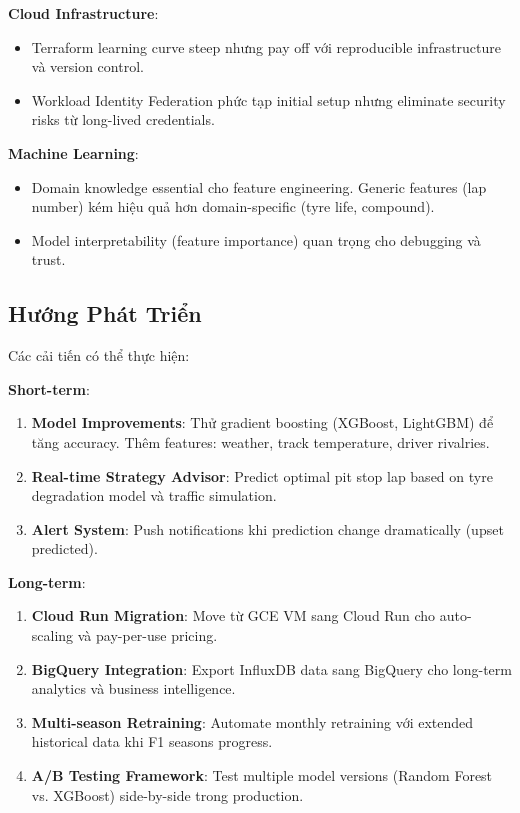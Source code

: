 \documentclass[conference,10pt]{IEEEtran}
\begin{document}
\textbf{Cloud Infrastructure}:
\begin{itemize}
    \item Terraform learning curve steep nhưng pay off với reproducible infrastructure và version control.
    \item Workload Identity Federation phức tạp initial setup nhưng eliminate security risks từ long-lived credentials.
\end{itemize}

\textbf{Machine Learning}:
\begin{itemize}
    \item Domain knowledge essential cho feature engineering. Generic features (lap number) kém hiệu quả hơn domain-specific (tyre life, compound).
    \item Model interpretability (feature importance) quan trọng cho debugging và trust.
\end{itemize}

\subsection{Hướng Phát Triển}

Các cải tiến có thể thực hiện:

\textbf{Short-term}:
\begin{enumerate}
    \item \textbf{Model Improvements}: Thử gradient boosting (XGBoost, LightGBM) để tăng accuracy. Thêm features: weather, track temperature, driver rivalries.

    \item \textbf{Real-time Strategy Advisor}: Predict optimal pit stop lap based on tyre degradation model và traffic simulation.

    \item \textbf{Alert System}: Push notifications khi prediction change dramatically (upset predicted).
\end{enumerate}

\textbf{Long-term}:
\begin{enumerate}
    \item \textbf{Cloud Run Migration}: Move từ GCE VM sang Cloud Run cho auto-scaling và pay-per-use pricing.

    \item \textbf{BigQuery Integration}: Export InfluxDB data sang BigQuery cho long-term analytics và business intelligence.

    \item \textbf{Multi-season Retraining}: Automate monthly retraining với extended historical data khi F1 seasons progress.

    \item \textbf{A/B Testing Framework}: Test multiple model versions (Random Forest vs. XGBoost) side-by-side trong production.
\end{enumerate}
\end{document}

